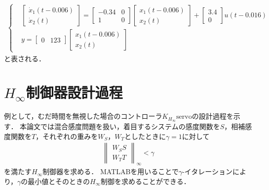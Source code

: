 \begin{align}
	\begin{cases}
		&\begin{bmatrix}
			\dot{x}_1(t-0.006)\\
			\dot{x}_2(t)
		\end{bmatrix}
		=
		\begin{bmatrix}
			-0.34 & 0\\
			1 & 0
		\end{bmatrix}
		\begin{bmatrix}
			x_1(t-0.006)\\
			x_2(t)
		\end{bmatrix}
		+
		\begin{bmatrix}
			3.4\\
			0
		\end{bmatrix}
		u(t-0.016) \\[10pt]
		&y =
		\begin{bmatrix}	
			0 & 123
		\end{bmatrix}
		\begin{bmatrix}
			x_1(t-0.006)\\
			x_2(t)
		\end{bmatrix}		
	\end{cases}
	\label{eqn:ss_inputTOfmea}
\end{align}
と表される．

\section{$H_\infty$制御器設計過程}
\label{sec:Hinfty_sekkei}
例として，むだ時間を無視した場合のコントローラ$K_{H_\infty}\mathrm{servo}$の設計過程を示す．
本論文では混合感度問題を扱い，着目するシステムの感度関数を$S$，相補感度関数を$T$，それぞれの重みを$W_S$，$W_T$としたときに$\gamma=1$に対して
\begin{align}
    \label{eq:gammaiter}
    \left\| \begin{matrix}
        W_S S\\W_T T
    \end{matrix}
    \right\|_\infty
    <\gamma
\end{align}
を満たす$H_\infty$制御器を求める．
MATLABを用いることで$\gamma$-イタレーションにより，$\gamma$の最小値とそのときの$H_\infty$制御を求めることができる．

